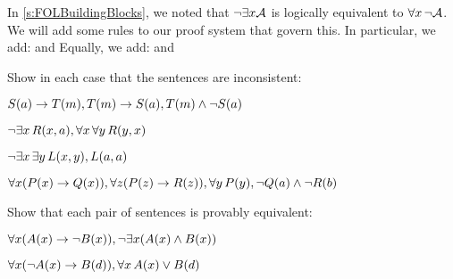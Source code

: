 In \cref{s:FOLBuildingBlocks}, we noted that $\neg\exists x\mathcal{A}$ is logically equivalent to $\forall x\, \neg\mathcal{A}$. We will add some rules to our proof system that govern this. In particular, we add:
and
Equally, we add:
and

\practiceproblems
\problempart
Show in each case that the sentences are inconsistent:
\begin{compactlist}
\item $S(a)\rightarrow T(m), T(m) \rightarrow S(a), T(m) \wedge \neg S(a)$
\item $\neg\exists x\,R(x,a), \forall x\, \forall y\,R(y,x)$
\item $\neg\exists x\, \exists y\,L(x,y), L(a,a)$
\item $\forall x(P(x) \rightarrow Q(x)), \forall z(P(z) \rightarrow R(z)), \forall y\,P(y), \neg Q(a) \wedge \neg R(b)$
\end{compactlist}

\problempart
Show that each pair of sentences is provably equivalent:
\begin{compactlist}
\item $\forall x (A(x)\rightarrow \neg B(x)), \neg\exists x(A(x) \wedge B(x))$
\item $\forall x (\neg A(x)\rightarrow B(d)), \forall x\,A(x) \vee B(d)$
\end{compactlist}

